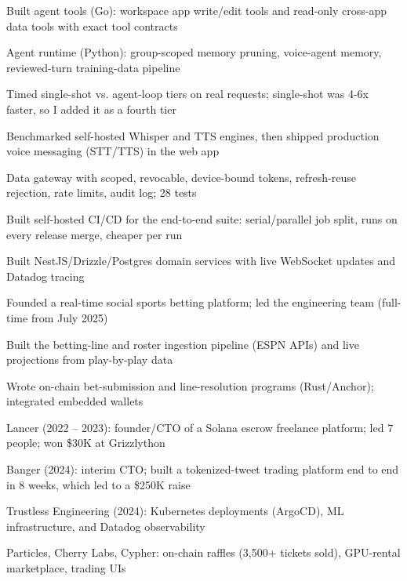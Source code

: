 \documentclass[print]{jack-resume}
\begin{document}
\begin{tightemize}
    \item Built agent tools (Go): workspace app write/edit tools and read-only cross-app data tools with exact tool contracts
    \item Agent runtime (Python): group-scoped memory pruning, voice-agent memory, reviewed-turn training-data pipeline
    \item Timed single-shot vs. agent-loop tiers on real requests; single-shot was 4-6x faster, so I added it as a fourth tier
    \item Benchmarked self-hosted Whisper and TTS engines, then shipped production voice messaging (STT/TTS) in the web app
    \item Data gateway with scoped, revocable, device-bound tokens, refresh-reuse rejection, rate limits, audit log; 28 tests
    \item Built self-hosted CI/CD for the end-to-end suite: serial/parallel job split, runs on every release merge, cheaper per run
\end{tightemize}
\sectionsep

\begin{tightemize}
    \item Built NestJS/Drizzle/Postgres domain services with live WebSocket updates and Datadog tracing
    \item Founded a real-time social sports betting platform; led the engineering team (full-time from July 2025)
    \item Built the betting-line and roster ingestion pipeline (ESPN APIs) and live projections from play-by-play data
    \item Wrote on-chain bet-submission and line-resolution programs (Rust/Anchor); integrated embedded wallets
\end{tightemize}
\sectionsep

\begin{tightemize}
    \item Lancer (2022 – 2023): founder/CTO of a Solana escrow freelance platform; led 7 people; won \$30K at Grizzlython
    \item Banger (2024): interim CTO; built a tokenized-tweet trading platform end to end in 8 weeks, which led to a \$250K raise
    \item Trustless Engineering (2024): Kubernetes deployments (ArgoCD), ML infrastructure, and Datadog observability
    \item Particles, Cherry Labs, Cypher: on-chain raffles (3,500+ tickets sold), GPU-rental marketplace, trading UIs
\end{tightemize}
\sectionsep
\end{document}
